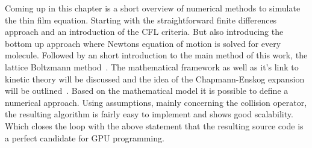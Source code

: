 Coming up in this chapter is a short overview of numerical methods to simulate the thin film equation.
Starting with the straightforward finite differences approach and an introduction of the CFL criteria.
But also introducing the bottom up approach where Newtons equation of motion is solved for every molecule.
Followed by an short introduction to the main method of this work, the lattice Boltzmann method~\cite{PhysRevLett.56.1505, krugerLatticeBoltzmannMethod2017, succi}. 
The mathematical framework as well as it's link to kinetic theory will be discussed and the idea of the Chapmann-Enskog expansion will be outlined~\cite{Chapman, Enskog}. 
Based on the mathematical model it is possible to define a numerical approach.
Using assumptions, mainly concerning the collision operator, the resulting algorithm is fairly easy to implement and shows good scalability.
Which closes the loop with the above statement that the resulting source code is a perfect candidate for GPU programming.

